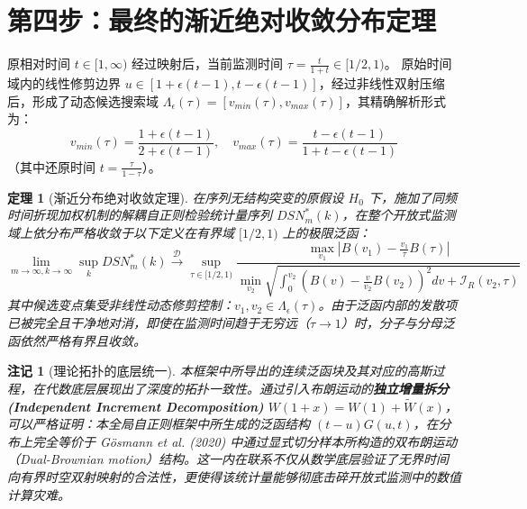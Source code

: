 \documentclass[11pt,a4paper]{article}
\newtheorem{theorem}{定理}[section]
\newtheorem{remark}{注记}[section]
\begin{document}
\section{第四步：最终的渐近绝对收敛分布定理}

原相对时间 $t \in [1, \infty)$ 经过映射后，当前监测时间 $\tau = \frac{t}{1+t} \in [1/2, 1)$。
原始时间域内的线性修剪边界 $u \in [1+\epsilon(t-1), t-\epsilon(t-1)]$，经过非线性双射压缩后，形成了动态候选搜索域 $\Lambda_\epsilon(\tau) = [v_{min}(\tau), v_{max}(\tau)]$，其精确解析形式为：
\begin{equation}
v_{min}(\tau) = \frac{1 + \epsilon(t - 1)}{2 + \epsilon(t - 1)}, \quad v_{max}(\tau) = \frac{t - \epsilon(t - 1)}{1 + t - \epsilon(t - 1)}
\end{equation}
（其中还原时间 $t = \frac{\tau}{1-\tau}$）。

\begin{theorem}[渐近分布绝对收敛定理]
在序列无结构突变的原假设 $H_0$ 下，施加了同频时间折现加权机制的解耦自正则检验统计量序列 $DSN^*_m(k)$，在整个开放式监测域上依分布严格收敛于以下定义在有界域 $[1/2, 1)$ 上的极限泛函：
\begin{equation}
\lim_{m \to \infty, k \to \infty} \sup_{k} DSN^*_m(k) \xrightarrow{\mathcal{D}} \sup_{\tau \in [1/2, 1)} \frac{ \max_{v_1} \left| B(v_1) - \frac{v_1}{\tau} B(\tau) \right| }{ \min_{v_2} \sqrt{ \int_0^{v_2} \left( B(v) - \frac{v}{v_2}B(v_2) \right)^2 dv + \mathcal{I}_R(v_2, \tau) } }
\end{equation}
其中候选变点集受非线性动态修剪控制：$v_1, v_2 \in \Lambda_\epsilon(\tau)$。由于泛函内部的发散项已被完全且干净地对消，即使在监测时间趋于无穷远（$\tau \to 1$）时，分子与分母泛函依然严格有界且收敛。
\end{theorem}

\vspace{0.5cm}

\begin{remark}[理论拓扑的底层统一]
本框架中所导出的连续泛函块及其对应的高斯过程，在代数底层展现出了深度的拓扑一致性。通过引入布朗运动的\textbf{独立增量拆分 (Independent Increment Decomposition)} $W(1+x) = W(1) + \tilde{W}(x)$，可以严格证明：本全局自正则框架中所生成的泛函结构 $(t-u)G(u,t)$，在分布上完全等价于 Gösmann et al. (2020) 中通过显式切分样本所构造的双布朗运动（Dual-Brownian motion）结构。这一内在联系不仅从数学底层验证了无界时间向有界时空双射映射的合法性，更使得该统计量能够彻底击碎开放式监测中的数值计算灾难。
\end{remark}
\end{document}
